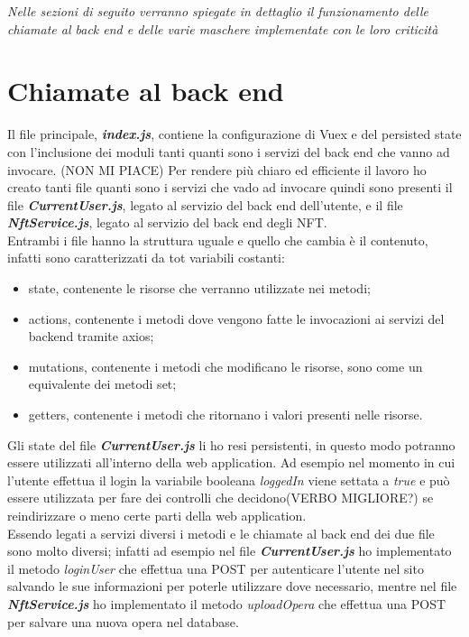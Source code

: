 \textit{Nelle sezioni di seguito verranno spiegate in dettaglio il funzionamento delle chiamate al back end e delle varie maschere implementate con le loro criticità}

\section{Chiamate al back end}
Il file principale, \textbf{\textit{index.js}}, contiene la configurazione di Vuex e del persisted state con l'inclusione dei moduli tanti quanti sono i servizi del back end che vanno ad invocare. (NON MI PIACE) Per rendere più chiaro ed efficiente il lavoro ho creato tanti file quanti sono i servizi che vado ad invocare quindi sono presenti il file \textbf{\textit{CurrentUser.js}}, legato al servizio del back end dell'utente, e il file \textbf{\textit{NftService.js}}, legato al servizio del back end degli NFT.\\
Entrambi i file hanno la struttura uguale e quello che cambia è il contenuto, infatti sono caratterizzati da tot variabili costanti:
\begin{itemize}
	\item state, contenente le risorse che verranno utilizzate nei metodi;
	\item actions, contenente i metodi dove vengono fatte le invocazioni ai servizi del backend tramite axios;
	\item mutations, contenente i metodi che modificano le risorse, sono come un equivalente dei metodi set;
	\item getters, contenente i metodi che ritornano i valori presenti nelle risorse.
\end{itemize}

Gli state del file \textbf{\textit{CurrentUser.js}} li ho resi persistenti, in questo modo potranno essere utilizzati all'interno della web application. Ad esempio nel momento in cui l'utente effettua il login la variabile booleana \textit{loggedIn} viene settata a \textit{true} e può essere utilizzata per fare dei controlli che decidono(VERBO MIGLIORE?) se reindirizzare o meno certe parti della web application.\\
Essendo legati a servizi diversi i metodi e le chiamate al back end dei due file sono molto diversi; infatti ad esempio nel file \textbf{\textit{CurrentUser.js}} ho implementato il metodo \textit{loginUser} che effettua una POST per autenticare l'utente nel sito salvando le sue informazioni per poterle utilizzare dove necessario, mentre nel file \textbf{\textit{NftService.js}} ho implementato il metodo \textit{uploadOpera} che effettua una POST per salvare una nuova opera nel database.

